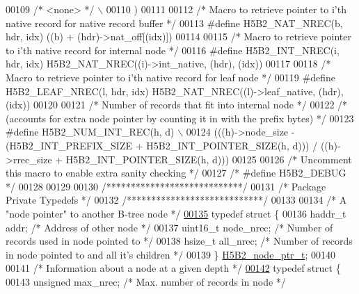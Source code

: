 \begin{DoxyCode}
{{00109 \textcolor{preprocessor}{    }\textcolor{comment}{/* <none> */}\textcolor{preprocessor}{                                                              \(\backslash\)}
00110 \textcolor{preprocessor}{    )}
00111 
00112 \textcolor{comment}{/* Macro to retrieve pointer to i'th native record for native record buffer */}
00113 \textcolor{preprocessor}{#define H5B2\_NAT\_NREC(b, hdr, idx)  ((b) + (hdr)->nat\_off[(idx)])}
00114 
00115 \textcolor{comment}{/* Macro to retrieve pointer to i'th native record for internal node */}
00116 \textcolor{preprocessor}{#define H5B2\_INT\_NREC(i, hdr, idx)  H5B2\_NAT\_NREC((i)->int\_native, (hdr), (idx))}
00117 
00118 \textcolor{comment}{/* Macro to retrieve pointer to i'th native record for leaf node */}
00119 \textcolor{preprocessor}{#define H5B2\_LEAF\_NREC(l, hdr, idx)  H5B2\_NAT\_NREC((l)->leaf\_native, (hdr), (idx))}
00120 
00121 \textcolor{comment}{/* Number of records that fit into internal node */}
00122 \textcolor{comment}{/* (accounts for extra node pointer by counting it in with the prefix bytes) */}
00123 \textcolor{preprocessor}{#define H5B2\_NUM\_INT\_REC(h, d) \(\backslash\)}
00124 \textcolor{preprocessor}{    (((h)->node\_size - (H5B2\_INT\_PREFIX\_SIZE + H5B2\_INT\_POINTER\_SIZE(h, d))) / ((h)->rrec\_size +
       H5B2\_INT\_POINTER\_SIZE(h, d)))}
00125 
00126 \textcolor{comment}{/* Uncomment this macro to enable extra sanity checking */}
00127 \textcolor{comment}{/* #define H5B2\_DEBUG */}
00128 
00129 
00130 \textcolor{comment}{/****************************/}
00131 \textcolor{comment}{/* Package Private Typedefs */}
00132 \textcolor{comment}{/****************************/}
00133 
00134 \textcolor{comment}{/* A "node pointer" to another B-tree node */}
\hyperlink{struct_h5_b2__node__ptr__t}{00135} \textcolor{keyword}{typedef} \textcolor{keyword}{struct }\{
00136     haddr\_t     addr;           \textcolor{comment}{/* Address of other node */}
00137     uint16\_t    node\_nrec;      \textcolor{comment}{/* Number of records used in node pointed to */}
00138     hsize\_t     all\_nrec;       \textcolor{comment}{/* Number of records in node pointed to and all it's children */}
00139 \} \hyperlink{struct_h5_b2__node__ptr__t}{H5B2\_node\_ptr\_t};
00140 
00141 \textcolor{comment}{/* Information about a node at a given depth */}
\hyperlink{struct_h5_b2__node__info__t}{00142} \textcolor{keyword}{typedef} \textcolor{keyword}{struct }\{
00143     \textcolor{keywordtype}{unsigned}    max\_nrec;       \textcolor{comment}{/* Max. number of records in node */}
}}
\end{DoxyCode}
